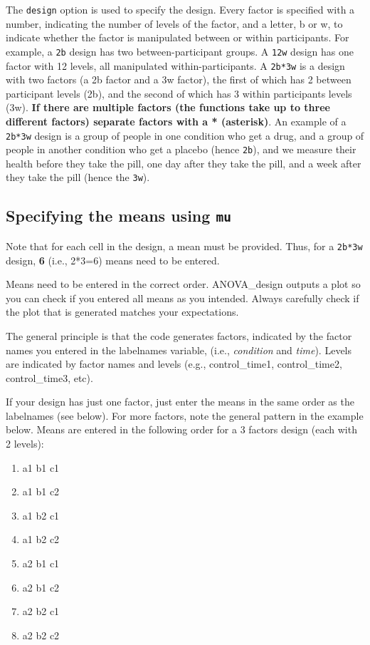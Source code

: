 \documentclass[
]{book}
\providecommand{\tightlist}{%
  \setlength{\itemsep}{0pt}\setlength{\parskip}{0pt}}
\begin{document}
The \texttt{design} option is used to specify the design.
Every factor is specified with a number, indicating the number of levels of the factor, and a letter, b or w, to indicate whether the factor is manipulated between or within participants.
For example, a \texttt{2b} design has two between-participant groups.
A \texttt{12w} design has one factor with 12 levels, all manipulated within-participants.
A \texttt{2b*3w} is a design with two factors (a 2b factor and a 3w factor), the first of which has 2 between participant levels (2b), and the second of which has 3 within participants levels (3w).
\textbf{If there are multiple factors (the functions take up to three different factors) separate factors with a * (asterisk)}.
An example of a \texttt{2b*3w} design is a group of people in one condition who get a drug, and a group of people in another condition who get a placebo (hence \texttt{2b}), and we measure their health before they take the pill, one day after they take the pill, and a week after they take the pill (hence the \texttt{3w}).

\hypertarget{specifying-the-means-using-mu}{%
\subsection{\texorpdfstring{Specifying the means using \texttt{mu}}{Specifying the means using mu}}\label{specifying-the-means-using-mu}}

Note that for each cell in the design, a mean must be provided. Thus, for a \texttt{2b*3w} design, \textbf{6} (i.e., 2*3=6) means need to be entered.

Means need to be entered in the correct order. ANOVA\_design outputs a plot so you can check if you entered all means as you intended. Always carefully check if the plot that is generated matches your expectations.

The general principle is that the code generates factors, indicated by the factor names you entered in the labelnames variable, (i.e., \emph{condition} and \emph{time}). Levels are indicated by factor names and levels (e.g., control\_time1, control\_time2, control\_time3, etc).

If your design has just one factor, just enter the means in the same order as the labelnames (see below). For more factors, note the general pattern in the example below. Means are entered in the following order for a 3 factors design (each with 2 levels):

\begin{enumerate}
\def\labelenumi{\arabic{enumi}.}
\tightlist
\item
  a1 b1 c1
\item
  a1 b1 c2
\item
  a1 b2 c1
\item
  a1 b2 c2
\item
  a2 b1 c1
\item
  a2 b1 c2
\item
  a2 b2 c1
\item
  a2 b2 c2
\end{enumerate}
\end{document}
